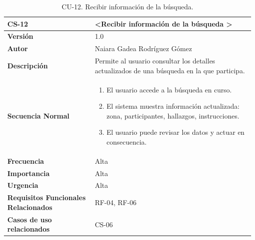 \begin{table}[htbp] %
\centering
\begin{tabular}{ |m{3cm}|m{11cm}|  } 
\hline
\cellcolor[HTML]{B9E3F0}\centering\textbf{CS-12} & \cellcolor[HTML]{B9E3F0}\textbf{\textless Recibir información de la búsqueda \textgreater}\\

\hline
\cellcolor[HTML]{EFEFEF}\textbf{Versión}             & 1.0  \\
\hline
\cellcolor[HTML]{EFEFEF}\textbf{Autor}                & Naiara Gadea Rodríguez Gómez\\
\hline
\cellcolor[HTML]{EFEFEF}\textbf{Descripción}                & { Permite al usuario consultar los detalles actualizados de una búsqueda en la que participa. }\\
\hline
\cellcolor[HTML]{EFEFEF}\textbf{Secuencia \newline Normal}                &                 
        \begin{enumerate}
            \item El usuario accede a la búsqueda en curso.
            \item El sistema muestra información actualizada: zona, participantes, hallazgos, instrucciones.
            \item El usuario puede revisar los datos y actuar en consecuencia.
        \end{enumerate}\\
\hline
\cellcolor[HTML]{EFEFEF}\textbf{Frecuencia}                & Alta\\
\hline
\cellcolor[HTML]{EFEFEF}\textbf{Importancia}                & Alta\\
\hline
\cellcolor[HTML]{EFEFEF}\textbf{Urgencia}                & Alta\\
\hline
\cellcolor[HTML]{EFEFEF}\textbf{Requisitos Funcionales Relacionados}                & { RF-04, RF-06 }\\
\hline
\cellcolor[HTML]{EFEFEF}\textbf{Casos de uso relacionados}                & { CS-06 }\\
\hline
\end{tabular}
\caption{CU-12. Recibir información de la búsqueda.}
\end{table}


